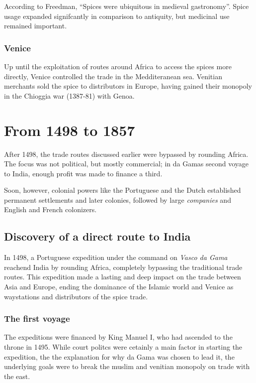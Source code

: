 \documentclass[11pt, a4paper, headings=standardclasses]{scrartcl}
\begin{document}
According to Freedman, ``Spices were ubiquitous in medieval gastronomy''.\autocite[3]{MST} Spice usage expanded signifcantly in comparison to antiquity, but medicinal use remained important.\autocite{RIS}

\subsubsection{Venice}

Up until the exploitation of routes around Africa to access the spices more directly, Venice controlled the trade in the Medditeranean sea. Venitian merchants sold the spice to distributors in Europe, having gained their monopoly in the Chioggia war (1387-81) with Genoa.\autocite{SpiceTrade}

\section{From 1498 to 1857}

After 1498, the trade routes discussed earlier were bypassed by rounding Africa. The focus was not political, but mostly commercial; in da Gamas second voyage to India, enough profit was made to finance a third.\autocite[Section \textit{The second voyage}]{Vasco}

Soon, however, colonial powers like the Portuguese and the Dutch established permanent settlements and later colonies, followed by large \emph{companies} and English and French colonizers.

\subsection{Discovery of a direct route to India}

In 1498, a Portuguese expedition under the command on \emph{Vasco da Gama} reachend India by rounding Africa, completely bypassing the traditional trade routes\autocite{VdG}. This expedition made a lasting and deep impact on the trade between Asia and Europe, ending the dominance of the Islamic world and Venice as waystations and distributors of the spice trade.\autocite{GLO}

\subsubsection{The first voyage}

The expeditions were financed by King Manuel I, who had ascended to the throne in 1495. While court politcs were cetainly a main factor in starting the expedition, the the explanation for why da Gama was chosen to lead it, the underlying goals were to break the muslim and venitian monopoly on trade with the east.\autocite{Vasco}
\end{document}
